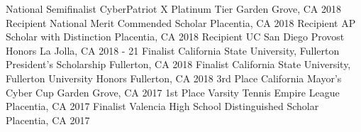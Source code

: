 

\begin{cvhonors}

  \cvhonor
    {National Semifinalist} %
    {CyberPatriot X Platinum Tier} %
    {Garden Grove, CA} %
    {2018} %
  \cvhonor
    {Recipient} %
    {National Merit Commended Scholar} %
    {Placentia, CA} %
    {2018} %
  \cvhonor
    {Recipient} %
    {AP Scholar with Distinction} %
    {Placentia, CA} %
    {2018} %
  \cvhonor
    {Recipient} %
    {UC San Diego Provost Honors} %
    {La Jolla, CA} %
    {2018 - 21} %
 \cvhonor
    {Finalist} %
    {California State University, Fullerton President's Scholarship} %
    {Fullerton, CA} %
    {2018} %
\cvhonor
    {Finalist} %
    {California State University, Fullerton University Honors} %
    {Fullerton, CA} %
    {2018} %
  \cvhonor
    {3rd Place} %
    {California Mayor's Cyber Cup} %
    {Garden Grove, CA} %
    {2017} %
\cvhonor
    {1st Place} %
    {Varsity Tennis Empire League} %
    {Placentia, CA} %
    {2017} %
\cvhonor
    {Finalist} %
    {Valencia High School Distinguished Scholar} %
    {Placentia, CA} %
    {2017} %

\end{cvhonors}
